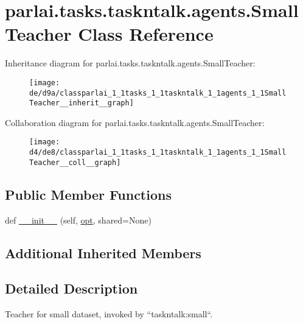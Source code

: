\hypertarget{classparlai_1_1tasks_1_1taskntalk_1_1agents_1_1SmallTeacher}{}\section{parlai.\+tasks.\+taskntalk.\+agents.\+Small\+Teacher Class Reference}
\label{classparlai_1_1tasks_1_1taskntalk_1_1agents_1_1SmallTeacher}


Inheritance diagram for parlai.\+tasks.\+taskntalk.\+agents.\+Small\+Teacher\+:\nopagebreak
\begin{figure}[H]
\begin{center}
\leavevmode
\texttt{[image: de/d9a/classparlai\_1\_1tasks\_1\_1taskntalk\_1\_1agents\_1\_1SmallTeacher\_\_inherit\_\_graph]}
\end{center}
\end{figure}


Collaboration diagram for parlai.\+tasks.\+taskntalk.\+agents.\+Small\+Teacher\+:\nopagebreak
\begin{figure}[H]
\begin{center}
\leavevmode
\texttt{[image: d4/de8/classparlai\_1\_1tasks\_1\_1taskntalk\_1\_1agents\_1\_1SmallTeacher\_\_coll\_\_graph]}
\end{center}
\end{figure}
\subsection*{Public Member Functions}
\begin{DoxyCompactItemize}
\item 
def \hyperlink{classparlai_1_1tasks_1_1taskntalk_1_1agents_1_1SmallTeacher_a840dfb1bc33447c389006c6b846babe0}{\+\_\+\+\_\+init\+\_\+\+\_\+} (self, \hyperlink{classparlai_1_1core_1_1agents_1_1Teacher_a3ce6243860ce978a897922863ed32fa4}{opt}, shared=None)
\end{DoxyCompactItemize}
\subsection*{Additional Inherited Members}


\subsection{Detailed Description}
\begin{DoxyVerb}Teacher for small dataset, invoked by ``taskntalk:small``.
\end{DoxyVerb}
 

